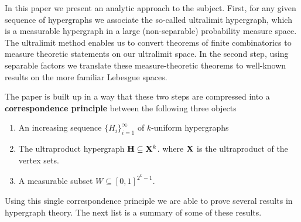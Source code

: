 \documentclass [11pt] {article}
\def\bH{{\bf H}}
\def\xo{{\bf X}}
\begin{document}
 In this paper we present an analytic approach to the subject.
First, for any given sequence of hypergraphs we associate the
so-called ultralimit hypergraph,
which is a measurable hypergraph in a large (non-separable)
probability measure space.
The ultralimit method enables us to convert theorems of finite
combinatorics to measure theoretic statements on our ultralimit
space. In the second step, using separable factors
we translate these measure-theoretic
theorems to well-known results on the more familiar Lebesgue
spaces.
 
The paper is built up in a way that these two steps are compressed into
a {\bf correspondence principle} between the following three objects
\begin{enumerate}
\item An increasing sequence $\{H_i\}_{i=1}^\infty$ of $k$-uniform hypergraphs
\item The ultraproduct hypergraph $\bH\subseteq\xo^k$.
where $\xo$ is the ultraproduct of the vertex sets.
\item A measurable subset $W\subseteq [0,1]^{2^k-1}$.
\end{enumerate}
Using this single correspondence principle we are able to prove 
several results in hypergraph theory.
The next list is a summary of some of these results.
\end{document}
